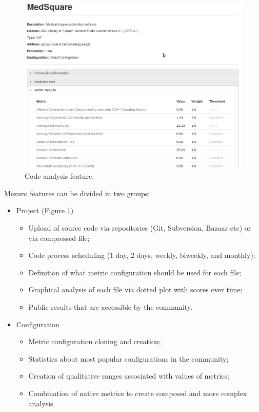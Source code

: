 \documentclass{llncs}
\begin{document}
\begin{figure}[hbt]
  \centering
    \includegraphics[width=.9\linewidth]{images/new-repository-results.png}
  \caption{Code analysis feature.}
  \label{fig:feature-1}
\end{figure}

Mezuro features can be divided in two groups:

\begin{itemize}
    \item Project (Figure \ref{fig:feature-1})

    \begin{itemize}
        \item Upload of source code via repositories (Git, Subversion, Bazaar etc) or via compressed file;
        \item Code process scheduling (1 day, 2 days, weekly, biweekly, and monthly);
        \item Definition of what metric configuration should be used for each file;
        \item Graphical analysis of each file via dotted plot with scores over time; %
        \item Public results that are accessible by the community.
    \end{itemize}
    \item Configuration
    \begin{itemize}
        \item Metric configuration cloning and creation;
        \item Statistics about most popular configurations in the community;
        \item Creation of qualitative ranges associated with values of metrics;
        \item Combination of native metrics to create composed and more complex analysis.
    \end{itemize}
\end{itemize}
\end{document}
